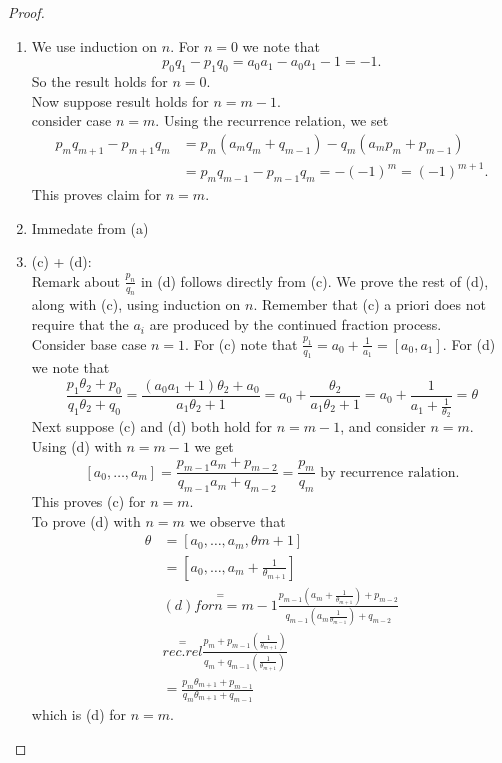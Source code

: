 \documentclass[NumTh.tex]{subfiles}
\begin{document}
\begin{proof}
  \begin{enumerate} %
    \item We use induction on $n$. For $n = 0$ we note that 
    \[ p_0 q_1 - p_1 q_0 = a_0 a_1 - a_0 a_1 - 1 = -1.\]
    So the result holds for $n = 0$.\\
    Now suppose result holds for $n = m - 1$.\\
    consider case $n = m$. Using the recurrence relation, we set
    \begin{align}
      p_m q_{m+1} - p_{m+1} q_m &= p_m (a_m q_m + q_{m-1}) - q_m ( a_m p_m + p_{m-1})\\
      &= p_m q_{m-1} - p_{m-1}q_m = - (-1)^m = (-1)^{m+1}.
    \end{align}
    This proves claim for $n = m$.
    \item Immedate from (a)
    \item (c) + (d):\\
    Remark about $\frac{p_n}{q_n}$ in (d) follows directly from (c).
    We prove the rest of (d), along with (c), using induction on $n$. Remember that (c) a priori does not require that the $a_i$ are produced by the continued fraction process.\\
    Consider base case $n = 1$. For (c) note that $\frac{p_1}{q_1} = a_0 + \frac{1}{a_1} = [a_0,a_1]$.
    For (d) we note that
    \[ \frac{p_1 \theta_2 + p_0}{q_1 \theta_2 + q_0} = \frac{(a_0 a_1 +1) \theta_2 + a_0}{a_1 \theta_2 + 1} = a_0 + \frac{\theta_2}{a_1 \theta_2 +1} = a_0 + \frac{1}{a_1 + \frac{1}{\theta_2}} = \theta \]
    Next suppose (c) and (d) both hold for $n = m-1$, and consider $n = m$. Using (d)  with $n = m -1$ we get
    \[ [a_0, \dots, a_m ] = \frac{p_{m-1} a_m + p_{m-2}}{q_{m-1} a_m + q_{m-2}} = \frac{p_m}{q_m} \text{ by recurrence ralation.} \]
    This proves (c) for $n=m$.\\
    To prove (d) with $n=m$ we observe that
    \begin{align}
      \theta &= [a_0,\dots,a_m,\theta{m+1} ] \\
      &= [a_0,\dots,a_m + \frac{1}{\theta_{m+1}} ]\\
      &\overset{=}{(d) for n=m-1} \frac{p_{m-1} (a_m + \frac{1}{\theta_{m+1}} ) + p_{m-2}}{q_{m-1} (a_m \frac{1}{\theta_{m-1}} ) + q_{m-2}}\\
      &\overset{=}{rec. rel} \frac{p_m + p_{m-1} (\frac{1}{\theta_{m+1}})}{q_m + q_{m-1} ( \frac{1}{\theta_{m+1}})}\\
      &= \frac{p_m \theta_{m+1} + p_{m-1}}{q_m \theta_{m+1} + q_{m-1}}
    \end{align}
    which is (d) for $n=m$.
  \end{enumerate}
\end{proof}
\end{document}
